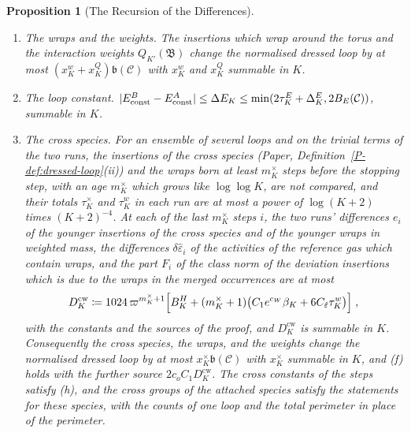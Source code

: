 \documentclass[11pt]{preprint}
\DeclarePairedDelimiter{\abs}{\lvert}{\rvert}
\numberwithin{equation}{section}
\newtheorem{proposition}{Proposition}
\theoremstyle{definition}
\theoremstyle{remark}
\theoremstyle{plain}
\begin{document}
\begin{proposition}[The Recursion of the Differences]
\begin{enumerate}[label=(\alph*)]
\item \emph{The wraps and the weights.} The insertions which wrap around the torus and the interaction weights $Q_{K'}(\mathfrak B)$ change the normalised dressed loop by at most $(x^w_K + x^Q_K)\mathfrak b(\mathcal C)$ with $x^w_K$ and $x^Q_K$ summable in $K$.
\item \emph{The loop constant.} $\abs{E^B_{\mathrm{const}} - E^A_{\mathrm{const}}} \leq \Delta E_K \leq \min(2\tau^E_K + \Delta^E_K, 2B_E(\mathcal C))$, summable in $K$.
\item \emph{The cross species.} For an ensemble of several loops and on the trivial terms of the two runs, the insertions of the cross species (Paper, Definition~\ref{P-def:dressed-loop}(ii)) and the wraps born at least $m^\times_K$ steps before the stopping step, with an age $m^\times_K$ which grows like $\log\log K$, are not compared, and their totals $\tau^\times_K$ and $\tau^w_K$ in each run are at most a power of $\log(K + 2)$ times $(K + 2)^{-4}$. At each of the last $m^\times_K$ steps $i$, the two runs' differences $e_i$ of the younger insertions of the cross species and of the younger wraps in weighted mass, the differences $\delta\hat\varepsilon_i$ of the activities of the reference gas which contain wraps, and the part $F_i$ of the class norm of the deviation insertions which is due to the wraps in the merged occurrences are at most
\begin{equation}\label{eq:joint-difference}
    D^{\mathrm{cw}}_K \coloneqq 1024\,\varpi^{m^\times_K+1}\Bigl[B^H_K + (m^\times_K + 1)\bigl(C_1e^{c_W}\beta_K + 6C_{\hat\varepsilon}\tau^w_K\bigr)\Bigr]\;,
\end{equation}
with the constants and the sources of the proof, and $D^{\mathrm{cw}}_K$ is summable in $K$. Consequently the cross species, the wraps, and the weights change the normalised dressed loop by at most $x^\times_K\mathfrak b(\mathcal C)$ with $x^\times_K$ summable in $K$, and (f) holds with the further source $2c_oC_1D^{\mathrm{cw}}_K$. The cross constants of the steps satisfy (h), and the cross groups of the attached species satisfy the statements for these species, with the counts of one loop and the total perimeter in place of the perimeter.
\end{enumerate}
\end{proposition}
\end{document}
